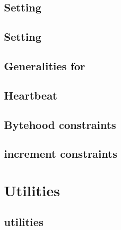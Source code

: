 \subsection{Setting \accInputs{}}                                           \label{bls data: setting acc pairings}                               
\subsection{Setting \internalChecksPassed{}}                                \label{bls data: setting internal checks have passed}                
\subsection{Generalities for \acceptablePairOfPoints{}}                     \label{bls data: generalities for acceptable pairs of points}        
\subsection{Heartbeat}                                                      \label{bls data: heartbeat}                                          
\subsection{Bytehood constraints}                                           \label{bls: bytehood and accumulator}                                
\subsection{\blsId{} increment constraints}                                 \label{bls: stamp increments}                                        

\section{Utilities}                                                                                                                             
\subsection{\wcpMod{} utilities}                                            \label{bls: wcp utilities}                                      

